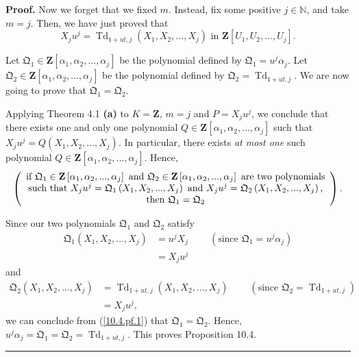 \documentclass[numbers=enddot,12pt,final,onecolumn,notitlepage]{scrartcl}%
\newenvironment{proof}[1][Proof]{\noindent\textbf{#1.} }{\ \rule{0.5em}{0.5em}}
\begin{document}
\begin{proof}
Now we forget that we fixed $m$. Instead, fix some positive $j\in\mathbb{N}$,
and take $m=j$. Then, we have just proved that
\[
X_{j}u^{j}=\operatorname*{Td}\nolimits_{1+ut,j}\left(  X_{1},X_{2}%
,...,X_{j}\right)  \text{ in }\mathbf{Z}\left[  U_{1},U_{2},...,U_{j}\right]
.
\]


Let $\mathfrak{Q}_{1}\in\mathbf{Z}\left[  \alpha_{1},\alpha_{2},...,\alpha
_{j}\right]  $ be the polynomial defined by $\mathfrak{Q}_{1}=u^{j}\alpha_{j}%
$. Let $\mathfrak{Q}_{2}\in\mathbf{Z}\left[  \alpha_{1},\alpha_{2}%
,...,\alpha_{j}\right]  $ be the polynomial defined by $\mathfrak{Q}%
_{2}=\operatorname*{Td}\nolimits_{1+ut,j}$. We are now going to prove that
$\mathfrak{Q}_{1}=\mathfrak{Q}_{2}$.

Applying Theorem 4.1 \textbf{(a)} to $K=\mathbf{Z}$, $m=j$ and $P=X_{j}u^{j}$,
we conclude that there exists one and only one polynomial $Q\in\mathbf{Z}%
\left[  \alpha_{1},\alpha_{2},...,\alpha_{j}\right]  $ such that $X_{j}%
u^{j}=Q\left(  X_{1},X_{2},...,X_{j}\right)  $. In particular, there exists
\textit{at most one} such polynomial $Q\in\mathbf{Z}\left[  \alpha_{1}%
,\alpha_{2},...,\alpha_{j}\right]  $. Hence,
\begin{equation}
\left(
\begin{array}
[c]{c}%
\text{if }\mathfrak{Q}_{1}\in\mathbf{Z}\left[  \alpha_{1},\alpha
_{2},...,\alpha_{j}\right]  \text{ and }\mathfrak{Q}_{2}\in\mathbf{Z}\left[
\alpha_{1},\alpha_{2},...,\alpha_{j}\right]  \text{ are two polynomials}\\
\text{such that }X_{j}u^{j}=\mathfrak{Q}_{1}\left(  X_{1},X_{2},...,X_{j}%
\right)  \text{ and }X_{j}u^{j}=\mathfrak{Q}_{2}\left(  X_{1},X_{2}%
,...,X_{j}\right)  \text{,}\\
\text{then }\mathfrak{Q}_{1}=\mathfrak{Q}_{2}%
\end{array}
\right)  . \label{10.4.pf.1}%
\end{equation}


Since our two polynomials $\mathfrak{Q}_{1}$ and $\mathfrak{Q}_{2}$ satisfy%
\begin{align*}
\mathfrak{Q}_{1}\left(  X_{1},X_{2},...,X_{j}\right)   &  =u^{j}%
X_{j}\ \ \ \ \ \ \ \ \ \ \left(  \text{since }\mathfrak{Q}_{1}=u^{j}\alpha
_{j}\right) \\
&  =X_{j}u^{j}%
\end{align*}
and%
\begin{align*}
\mathfrak{Q}_{2}\left(  X_{1},X_{2},...,X_{j}\right)   &  =\operatorname*{Td}%
\nolimits_{1+ut,j}\left(  X_{1},X_{2},...,X_{j}\right)
\ \ \ \ \ \ \ \ \ \ \left(  \text{since }\mathfrak{Q}_{2}=\operatorname*{Td}%
\nolimits_{1+ut,j}\right) \\
&  =X_{j}u^{j},
\end{align*}
we can conclude from (\ref{10.4.pf.1}) that $\mathfrak{Q}_{1}=\mathfrak{Q}%
_{2}$. Hence, $u^{j}\alpha_{j}=\mathfrak{Q}_{1}=\mathfrak{Q}_{2}%
=\operatorname*{Td}\nolimits_{1+ut,j}$. This proves Proposition 10.4.
\end{proof}
\end{document}
